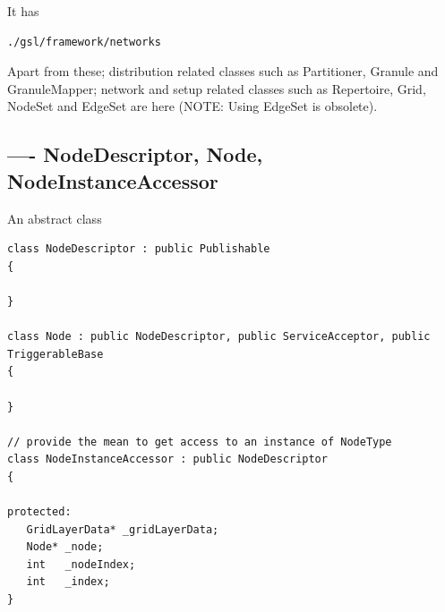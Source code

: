 It has
\begin{verbatim}
./gsl/framework/networks
\end{verbatim}

Apart from these; distribution related classes such as Partitioner, Granule and
GranuleMapper; network and setup related classes such as Repertoire, Grid,
NodeSet and EdgeSet are here (NOTE: Using EdgeSet is obsolete).

\subsection{---- NodeDescriptor, Node, NodeInstanceAccessor}
\label{sec:NodeDescriptor}
\label{sec:Node}
\label{sec:NodeInstanceAccessor}

An abstract class
\begin{lstlisting}
class NodeDescriptor : public Publishable
{

}

class Node : public NodeDescriptor, public ServiceAcceptor, public TriggerableBase
{

}

// provide the mean to get access to an instance of NodeType
class NodeInstanceAccessor : public NodeDescriptor 
{

protected:
   GridLayerData* _gridLayerData;
   Node* _node;
   int   _nodeIndex;
   int   _index;
}
\end{lstlisting}

